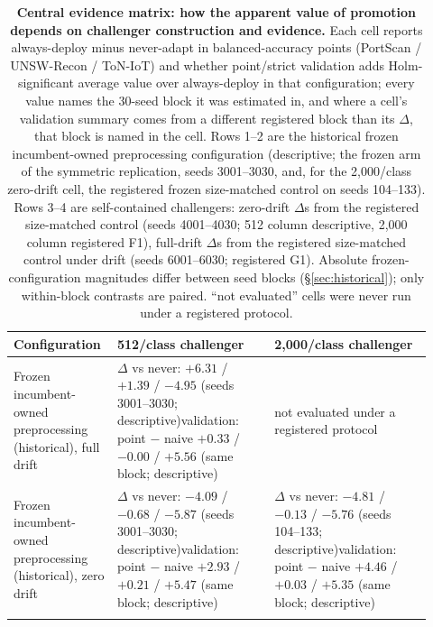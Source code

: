 \begin{table}[t]
\centering
\caption{\textbf{Central evidence matrix: how the apparent value of promotion depends on
challenger construction and evidence.} Each cell reports always-deploy minus never-adapt in
balanced-accuracy points (PortScan / UNSW-Recon / ToN-IoT) and whether point/strict validation
adds Holm-significant average value over always-deploy in that configuration; every value
names the 30-seed block it was estimated in, and where a cell's validation summary comes from
a different registered block than its $\Delta$, that block is named in the cell. Rows 1--2 are
the historical frozen incumbent-owned preprocessing configuration (descriptive; the frozen arm
of the symmetric replication, seeds 3001--3030, and, for the 2{,}000/class zero-drift cell,
the registered frozen size-matched control on seeds 104--133). Rows 3--4 are self-contained
challengers: zero-drift $\Delta$s from the registered size-matched control (seeds 4001--4030;
512 column descriptive, 2{,}000 column registered F1), full-drift $\Delta$s from the
registered size-matched control under drift (seeds 6001--6030; registered G1). Absolute
frozen-configuration magnitudes differ between seed blocks (\S\ref{sec:historical}); only
within-block contrasts are paired. ``not evaluated'' cells were never run under a registered
protocol.}
\label{tab:synthesis}
\footnotesize
\setlength{\tabcolsep}{4pt}
\renewcommand{\arraystretch}{1.15}
\begin{tabular}{p{0.20\linewidth} p{0.36\linewidth} p{0.36\linewidth}}
\toprule
Configuration & 512/class challenger & 2{,}000/class challenger \\
\midrule
Frozen incumbent-owned preprocessing (historical), full drift &
$\Delta$ vs never: $+6.31$ / $+1.39$ / $-4.95$ (seeds 3001--3030; descriptive)\newline validation: point $-$ naive $+0.33$ / $-0.00$ / $+5.56$ (same block; descriptive) &
not evaluated under a registered protocol \\
\addlinespace
Frozen incumbent-owned preprocessing (historical), zero drift &
$\Delta$ vs never: $-4.09$ / $-0.68$ / $-5.87$ (seeds 3001--3030; descriptive)\newline validation: point $-$ naive $+2.93$ / $+0.21$ / $+5.47$ (same block; descriptive) &
$\Delta$ vs never: $-4.81$ / $-0.13$ / $-5.76$ (seeds 104--133; descriptive)\newline validation: point $-$ naive $+4.46$ / $+0.03$ / $+5.35$ (same block; descriptive) \\
\addlinespace

\end{tabular}
\end{table}
